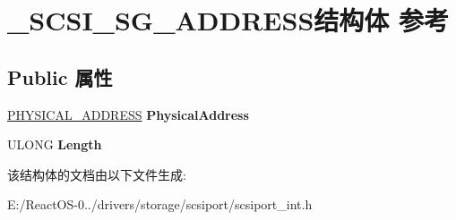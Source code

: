 \hypertarget{struct___s_c_s_i___s_g___a_d_d_r_e_s_s}{}\section{\+\_\+\+S\+C\+S\+I\+\_\+\+S\+G\+\_\+\+A\+D\+D\+R\+E\+S\+S结构体 参考}
\label{struct___s_c_s_i___s_g___a_d_d_r_e_s_s}
\subsection*{Public 属性}
\begin{DoxyCompactItemize}
\item 
\mbox{\label{struct___s_c_s_i___s_g___a_d_d_r_e_s_s_ac7079e9c35f13eecf0405e6ef6f1bc70}} 
\hyperlink{union___l_a_r_g_e___i_n_t_e_g_e_r}{P\+H\+Y\+S\+I\+C\+A\+L\+\_\+\+A\+D\+D\+R\+E\+SS} {\bfseries Physical\+Address}
\item 
\mbox{\label{struct___s_c_s_i___s_g___a_d_d_r_e_s_s_a5e8600b1def114b9e89aa0d2f8b61e9f}} 
U\+L\+O\+NG {\bfseries Length}
\end{DoxyCompactItemize}


该结构体的文档由以下文件生成\+:\begin{DoxyCompactItemize}
\item 
E\+:/\+React\+O\+S-\/0../drivers/storage/scsiport/scsiport\+\_\+int.\+h\end{DoxyCompactItemize}
